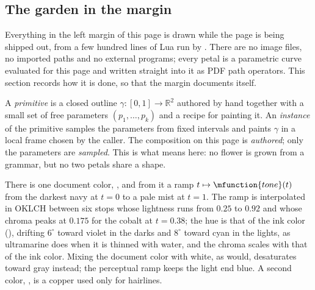 \subsection{The garden in the margin}

Everything in the left margin of this page is drawn while the page is being shipped out,
from a few hundred lines of Lua run by \LUAMETATEX. There are no image files, no imported
paths and no external programs; every petal is a parametric curve evaluated for this page
and written straight into it as PDF path operators. This section records how it is done,
so that the margin documents itself.

\startdefinition
A \emph{primitive} is a closed outline $\gamma\colon[0,1]\to\mathbb{R}^2$ authored by hand
together with a small set of free parameters $(p_1,\dots,p_k)$ and a recipe for painting
it. An \emph{instance} of the primitive samples the parameters from fixed intervals and
paints $\gamma$ in a local frame chosen by the caller. The composition on this page is
\emph{authored}; only the parameters are \emph{sampled}. This is what 
means here: no flower is grown from a grammar, but no two petals share a shape.
\stopdefinition

\startconstruction[title={Palette}]
There is one document color, , and from it a ramp $t\mapsto\mfunction{tone}(t)$
from the darkest navy at $t=0$ to a pale mist at $t=1$. The ramp is interpolated in
OKLCH between six stops whose lightness runs from $0.25$ to $0.92$ and whose chroma peaks
at $0.175$ for the cobalt at $t=0.38$; the hue is that of the ink color (), drifting $6^\circ$
toward violet in the darks and $8^\circ$ toward cyan in the lights, as ultramarine does when
it is thinned with water, and the chroma scales with that of the ink color. Mixing the
document color with white, as  would, desaturates
toward gray instead; the perceptual ramp keeps the light end blue. A second color,
, is a copper used only for hairlines.
\stopconstruction


